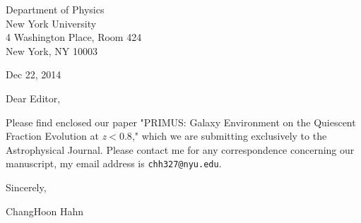 \documentclass{letter}
\begin{document}
\begin{flushleft}
\begin{singlespace}
Department of Physics\\
New York University\\
4 Washington Place, Room 424\\
New York, NY 10003
\end{singlespace}

\vspace{0.5cm}

Dec 22, 2014

\vspace{0.5cm}

Dear Editor,

Please find enclosed our paper "PRIMUS: Galaxy Environment on the Quiescent Fraction Evolution at \lowercase{\textit{z}}$<0.8$," which we are submitting exclusively to the Astrophysical Journal.  Please contact me for any correspondence concerning our manuscript, my email address is \texttt{chh327@nyu.edu}.

\vspace{0.5cm}

Sincerely,

ChangHoon Hahn
\end{flushleft}
\end{document}
